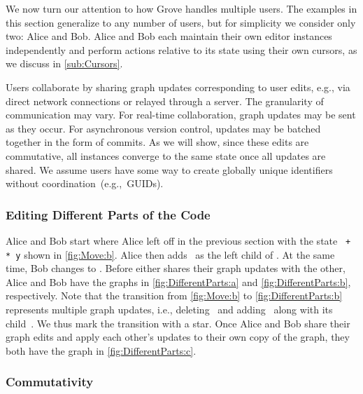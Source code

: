 We now turn our attention to how Grove handles multiple users.
The examples in this section generalize to any number of users,
but for simplicity we consider only two: Alice and Bob.
Alice and Bob each maintain their own editor instances independently
and perform actions relative to its state using their own cursors, as we discuss in \autoref{sub:Cursors}.

Users collaborate by sharing graph updates corresponding to user edits,
e.g., via direct network connections or relayed through a server.
The granularity of communication may vary.
For real-time collaboration, graph updates may be sent as they occur.
For asynchronous version control, updates may be batched together in the form of commits.
As we will show, since these edits are commutative,
all instances converge to the same state once all updates are shared.
We assume users have some way to create globally unique identifiers
without coordination~(e.g.,~GUIDs).

\subsubsection{Editing Different Parts of the Code}%
\label{sub:Editing Different Parts of the Code}

Alice and Bob start where Alice left off in the previous section
with the state \texttt{\hole{} + \hole{} * y} shown in \autoref{fig:Move:b}.
Alice then adds~\vDifferentPartsAlice{} as the left child of \vSimpleTimes{}.
At the same time, Bob changes \vSimpleY{} to \vDifferentPartsBob{}.
Before either shares their graph updates with the other,
Alice and Bob have the graphs in \autoref{fig:DifferentParts:a} and \autoref{fig:DifferentParts:b}, respectively.
Note that the transition from \autoref{fig:Move:b} to \autoref{fig:DifferentParts:b}
represents multiple graph updates,
i.e., deleting~\eSimpleY{} and adding~\eDifferentPartsBob{} along with its child~\vDifferentPartsBob{}.
We thus mark the transition with a star.
Once Alice and Bob share their graph edits and apply each other's updates to their own copy of the graph,
they both have the graph in \autoref{fig:DifferentParts:c}.


\subsubsection{Commutativity}%
\label{sub:Commutativity:informal}

